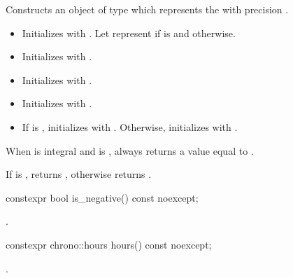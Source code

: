 \begin{itemdescr}
\pnum
\effects
Constructs an object of type 
which represents the  with precision .
\begin{itemize}
\item
  Initializes  with .
  Let  represent
   if  is  and
   otherwise.
\item
  Initializes  with .
\item
  Initializes 
  with .
\item
  Initializes 
  with .
\item
  If  is ,
  initializes  with .
  Otherwise, initializes 
  with .
\end{itemize}
\begin{note}
When  is integral and
 is ,
 always returns a value equal to .
\end{note}

\pnum
\ensures
If  is ,
 returns ,
otherwise  returns .
\end{itemdescr}

%
\begin{itemdecl}
constexpr bool is_negative() const noexcept;
\end{itemdecl}

\begin{itemdescr}
\pnum
\returns
{}.
\end{itemdescr}

%
\begin{itemdecl}
constexpr chrono::hours hours() const noexcept;
\end{itemdecl}

\begin{itemdescr}
\pnum
\returns
{}.
\end{itemdescr}

